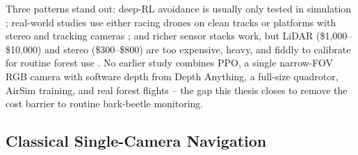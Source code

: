 \documentclass[../main.tex]{subfiles}
\begin{document}
\begin{table}[H]
\centering
\caption{Comparison of closely related studies along the axes used in this thesis.}
\label{tab:related_work}
\end{table}

Three patterns stand out: deep-RL avoidance is usually only tested in simulation \cite{Kabas2022}; real-world studies use either racing drones on clean tracks \cite{Loquercio2019} or platforms with stereo and tracking cameras \cite{DelCol2025}; and richer sensor stacks work, but LiDAR (\$1{,}000--\$10{,}000) and stereo (\$300--\$800) are too expensive, heavy, and fiddly to calibrate for routine forest use \cite{Butt2024,Hrabar2012}. No earlier study combines PPO, a single narrow-FOV RGB camera with software depth from Depth Anything, a full-size quadrotor, AirSim training, and real forest flights -- the gap this thesis closes to remove the cost barrier to routine bark-beetle monitoring.

\subsection{Classical Single-Camera Navigation}
\end{document}
